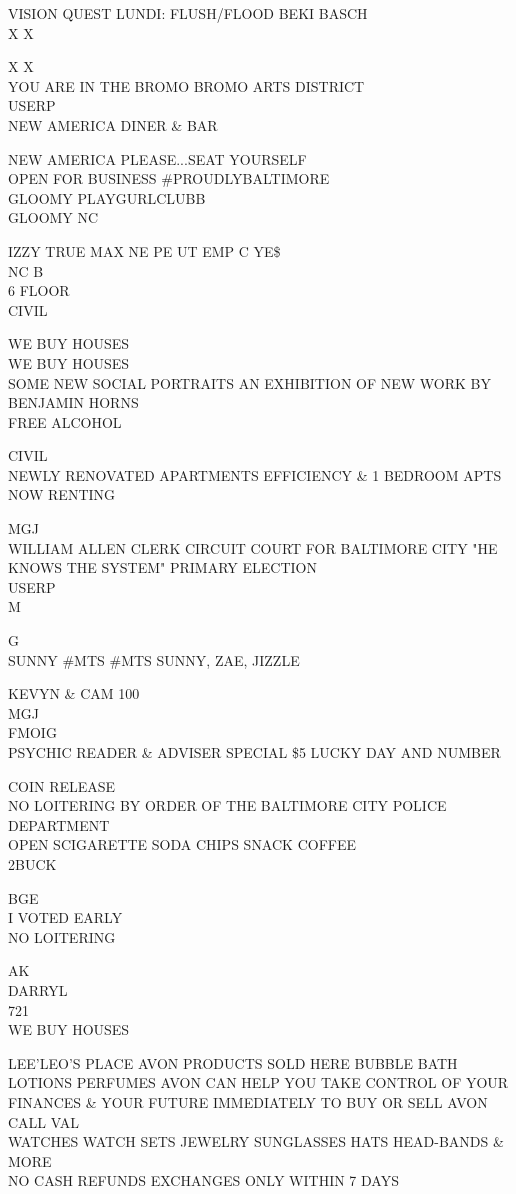 \documentclass[10pt,letterpaper]{article}
\begin{document}
VISION QUEST LUNDI: FLUSH/FLOOD BEKI BASCH\\
X X

X X\\
YOU ARE IN THE BROMO BROMO ARTS DISTRICT\\
USERP\\
NEW AMERICA DINER \& BAR

NEW AMERICA PLEASE...SEAT YOURSELF\\
OPEN FOR BUSINESS \#PROUDLYBALTIMORE\\
GLOOMY PLAYGURLCLUBB\\
GLOOMY NC

IZZY TRUE MAX NE PE UT EMP C YE\$\\
NC B\\
6 FLOOR\\
CIVIL

WE BUY HOUSES\\
WE BUY HOUSES\\
SOME NEW SOCIAL PORTRAITS AN EXHIBITION OF NEW WORK BY BENJAMIN HORNS\\
FREE ALCOHOL

CIVIL\\
NEWLY RENOVATED APARTMENTS EFFICIENCY \& 1 BEDROOM APTS NOW RENTING

MGJ\\
WILLIAM ALLEN CLERK CIRCUIT COURT FOR BALTIMORE CITY "HE KNOWS THE SYSTEM" PRIMARY ELECTION\\
USERP\\
M

G\\
SUNNY \#MTS \#MTS SUNNY, ZAE, JIZZLE

KEVYN \& CAM 100\\
MGJ\\
FMOIG\\
PSYCHIC READER \& ADVISER SPECIAL \$5 LUCKY DAY AND NUMBER

COIN RELEASE\\
NO LOITERING BY ORDER OF THE BALTIMORE CITY POLICE DEPARTMENT\\
OPEN SCIGARETTE SODA CHIPS SNACK COFFEE\\
2BUCK

BGE\\
I VOTED EARLY\\
NO LOITERING

AK\\
DARRYL\\
721\\
WE BUY HOUSES

LEE'LEO'S PLACE AVON PRODUCTS SOLD HERE BUBBLE BATH LOTIONS PERFUMES AVON CAN HELP YOU TAKE CONTROL OF YOUR FINANCES \& YOUR FUTURE IMMEDIATELY TO BUY OR SELL AVON CALL VAL\\
WATCHES WATCH SETS JEWELRY SUNGLASSES HATS HEAD{-}BANDS \& MORE\\
NO CASH REFUNDS EXCHANGES ONLY WITHIN 7 DAYS
\end{document}
